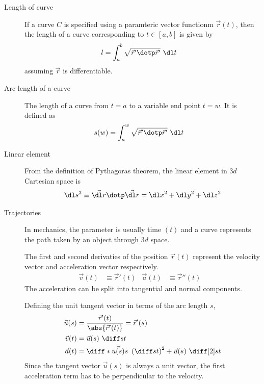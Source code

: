\begin{description}
    \item[Length of curve] If a curve $ C $ is specified using a paramteric vector
          functionm $ \vec{r}(t) $, then the length of a curve corresponding to
          $ t \in [a,b] $ is given by
          \begin{align}
              l & = \int_{a}^{b} \sqrt{\vec{r}' \dotp \vec{r}'}\ \dl t
          \end{align}
          assuming $ \vec{r} $ is differentiable.

    \item[Arc length of a curve] The length of a curve from $ t = a $ to a variable end
          point $ t = w $. It is defined as
          \begin{align}
              s(w) & = \int_{a}^{w} \sqrt{\vec{r}' \dotp \vec{r}'}\ \dl t
          \end{align}

    \item[Linear element] From the definition of Pythagoras theorem, the linear element
          in $ 3d $ Cartesian space is
          \begin{align}
              \dl s^2 \equiv \vec{\dl r} \dotp  \vec{\dl r}
              = \dl x^2 + \dl y^2 + \dl z^2
          \end{align}

    \item[Trajectories] In mechanics, the parameter is usually time $ (t) $ and a curve
          represents the path taken by an object through $ 3d $ space. \par
          The first and second derivaties of the position $ \vec{r}(t) $ represent the
          velocity vector and acceleration vector respectively.
          \begin{align}
              \vec{v}(t) & \equiv \vec{r}'(t)  &
              \vec{a}(t) & \equiv \vec{r}''(t) &
          \end{align}
          The acceleration can be split into tangential and normal components. \par
          Defining the unit tangent vector in terms of the arc length $ s $,
          \begin{align}
              \vec{u}(s) & = \frac{\vec{r}'(t)}{\abs{\vec{r}'(t)}} = \vec{r}'(s) \\
              \vec{v}(t) & = \vec{u}(s)\ \diff st                                \\
              \vec{a}(t) & = \diff*{\vec{u(s)}}{s}\ \left( \diff st \right)^2 +
              \vec{u}(s)\ \diff[2] st                                            \\
          \end{align}
          Since the tangent vector $ \vec{u}(s) $ is always a unit vector, the first
          acceleration term has to be perpendicular to the velocity.


\end{description}
